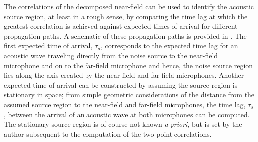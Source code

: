 %
%
The correlations of the decomposed near-field can be used to identify the acoustic source region, at least in a rough sense, by comparing the time lag at which the greatest correlation is achieved against expected times-of-arrival for different propagation paths.
A schematic of these propagation paths is provided in .
The first expected time of arrival, $\tau_a$, corresponds to the expected time lag for an acoustic wave traveling directly from the noise source to the near-field microphone and on to the far-field microphone and hence, the noise source region lies along the axis created by the near-field and far-field microphones.
Another expected time-of-arrival can be constructed by assuming the source region is stationary in space; from simple geometric considerations of the distance from the assumed source region to the near-field and far-field microphones, the time lag, $\tau_s$, between the arrival of an acoustic wave at both microphones can be computed.
The stationary source region is of course not known \textit{a priori}, but is set by the author subsequent to the computation of the two-point correlations.

